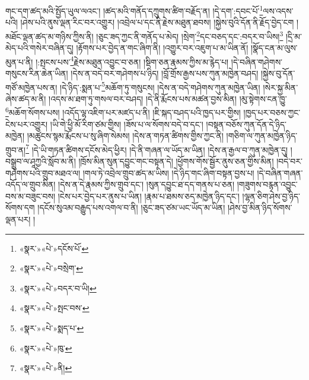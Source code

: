 གང་དག་ཚད་མའི་སྤྱོད་ཡུལ་ལའང་། །ཚད་མའི་གནོད་དཀྲུགས་ཚིག་བརྗོད་ན། །དེ་དག་:དབང་པོ་\footnote{«སྣར་»«པེ་»དངོས་པོ་}ལས་འདས་པའི། །ཤེས་པའི་ནུས་ལྡན་རིང་བར་འགྱུར། །འབྲེལ་པ་དང་ནི་རྗེས་མཐུན་ཐབས། །སྐྱེས་བུའི་དོན་ནི་རྗོད་བྱེད་ངག །མཐོང་ལྡན་ཚད་མ་གཉིས་ཀྱིས་ནི། །ཅུང་ཟད་ཀྱང་ནི་གནོད་པ་མེད། །སྲེག་\footnote{«སྣར་»«པེ་»བསྲེག་}དང་བཅད་དང་:བདར་བ་ཡིས།\footnote{«སྣར་»«པེ་»བདར་བ་ཡི།} །དྲི་མ་མེད་པའི་གསེར་བཞིན་དུ། །རྟོགས་པར་བྱེད་ན་གང་ཞིག་ནི། །འགྱུར་བར་འཇུག་པ་མ་ཡིན་ནོ། །སྣོད་ངན་མ་ལུས་མུན་པ་ནི། །:སྤངས་པས་\footnote{«སྣར་»«པེ་»སྤང་བས་}རྗེས་མཐུན་འབྱུང་བ་ཅན། །སྡིག་ཅན་རྣམས་ཀྱིས་མ་རྙེད་པ། །དེ་བཞིན་གཤེགས་གསུངས་རིན་ཆེན་ཡིན། །དེས་ན་བདེ་བར་གཤེགས་པ་ཉིད། །བློ་གྲོས་རྒྱས་པས་ཀུན་མཁྱེན་བཤད། །སྐྱེས་བུ་དོན་གཙོ་མཁྱེན་པས་ན། །དེ་ཉིད་:སྨན་པ་\footnote{«སྣར་»«པེ་»སྨད་པ་}མཆོག་ཏུ་གསུངས། །དེས་ན་བདེ་གཤེགས་ཀུན་མཁྱེན་ཡིན། །སེར་སྐྱ་མིན་ཞེས་ཚད་མ་ནི། །འདས་མ་ཐག་ཏུ་གསལ་བར་བཤད། །དེ་ནི་རྨོངས་པས་མཚན་བྱས་མིན། །མུ་སྟེགས་ངན་ཁྱུ་\footnote{«སྣར་»«པེ་»ཁུ་}མཆོག་སོགས་པས། །འདོད་ལྷ་འཇིག་པར་མཛད་པ་ནི། །ཇི་སྐད་བཤད་པའི་ཁྱད་པར་གྱིས། །ཁྱད་པར་བཅས་ཀྱང་ངེས་པར་འགྱུར། །ཡི་གེ་ཕྱི་མོ་རིག་ཙམ་གྱིས། །ཟོས་པ་ལ་སོགས་བདེ་བ་དང་། །བསྟན་བཅོས་ཀུན་དོན་དེ་ཉིད་མཁྱེན། །མཚུངས་སྙམ་རྨོངས་པ་སུ་ཞིག་སེམས། །དེས་ན་གཏན་ཚིགས་གྱིས་ཀྱང་ནི། །གཅིག་ལ་ཀུན་མཁྱེན་ཉིད་གྲུབ་ན།\footnote{«སྣར་»«པེ་»ནི།} །དེ་ཡི་གཏན་ཚིགས་དངོས་མེད་ཕྱིར། །དེ་ནི་གཞན་ལ་ཡོད་མ་ཡིན། །དེས་ན་རྒྱལ་བ་ཀུན་མཁྱེན་དུ། །བསྒྲུབ་ལ་ཤཱཀྱའི་སློབ་མ་ནི། །ཁྲོས་མིན་སུན་དབྱུང་གང་བསྟན་དེ། །ཕྱོགས་གོས་སྦྱོར་ནུས་ཅན་གྱིས་མིན། །བདེ་བར་གཤེགས་པའི་གྲུབ་མཐའ་ལ། །གལ་ཏེ་འབྲེལ་གྲུབ་ཚད་མ་ཡིས། །དེ་ཉིད་གང་ཞིག་བསྟན་བྱས་པ། །དེ་བཞིན་གཞན་འདོད་ལ་གྲུབ་མིན། །དེས་ན་དེ་རྣམས་ཀྱིས་གྲུབ་དང་། །སུན་དབྱུང་ཐ་དད་གནས་པ་ཅན། །གཟུགས་བརྙན་འབྱུང་བས་མ་བཟུང་བས། །ངེས་པར་བྱེད་པར་ནུས་པ་ཡིན། །རྣམ་པ་ཐམས་ཅད་མཁྱེན་ཉིད་དང་། །ལྷན་ཅིག་ཤེས་བྱ་ཉིད་སོགས་དག །དངོས་སུའམ་བརྒྱུད་པས་འགལ་བ་ནི། །ཅུང་ཟད་ཙམ་ཡང་ཡོད་མ་ཡིན། །ཤེས་བྱ་མིན་ཉིད་སོགས་ལྡན་པར། །
